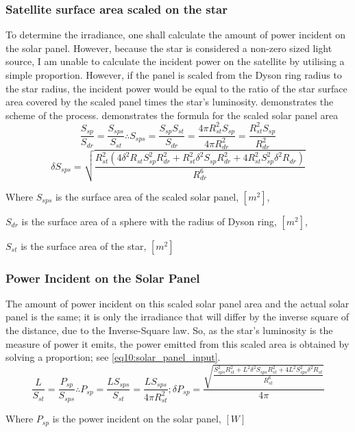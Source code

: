 \documentclass[stu, 11pt, a4paper, floatsintext, noextraspace]{apa7}
\begin{document}
	\subsubsection{Satellite surface area scaled on the star}
	To determine the irradiance, one shall calculate the amount of power incident on the solar panel. However, because the star is considered a non-zero sized light source, I am unable to calculate the incident power on the satellite by utilising a simple proportion. However, if the panel is scaled from the Dyson ring radius to the star radius, the incident power would be equal to the ratio of the star surface area covered by the scaled panel times the star's luminosity.  demonstrates the scheme of the process.  demonstrates the formula for the scaled solar panel area
	\begin{equation}
		\label{eq9:solar_panel_area_scaled}
		\frac{S_{sp}}{S_{dr}} = \frac{S_{sps}}{S_{st}} \therefore S_{sps} = \frac{S_{sp}S_{st}}{S_{dr}} = \frac{4\pi R^2_{st}S_{sp}}{4\pi R^2_{dr}}=\frac{R^2_{st}S_{sp}}{R^2_{dr}}
	\end{equation}
	\begin{equation*}
		\delta S_{sps}=\sqrt{\frac{R_{st}^2\left(4\delta^2R_{st}S_{sp}^2R_{dr}^2+R_{st}^2\delta^2S_{sp}R_{dr}^2+4R_{st}^2S_{sp}^2\delta^2R_{dr}\right)}{R_{dr}^6}}
	\end{equation*}
	\begin{center}
		Where $S_{sps}$ is the surface area of the scaled solar panel, $[m^2]$,
		
		$S_{dr}$ is the surface area of a sphere with the radius of Dyson ring, $[m^2]$,
		
		$S_{st}$ is the surface area of the star, $[m^2]$
	\end{center}
	\subsubsection{Power Incident on the Solar Panel}
	The amount of power incident on this scaled solar panel area and the actual solar panel is the same; it is only the irradiance that will differ by the inverse square of the distance, due to the Inverse-Square law. So, as the star's luminosity is the measure of power it emits, the power emitted from this scaled area is obtained by solving a proportion; see \cref{eq10:solar_panel_input}.
	\begin{equation}
		\label{eq10:solar_panel_input}
		\frac{L}{S_{st}} = \frac{P_{sp}}{S_{sps}} \therefore P_{sp} = \frac{LS_{sps}}{S_{st}}=\frac{LS_{sps}}{4\pi R_{st}^2}; \delta P_{sp}=\frac{\sqrt{\frac{S_{sps}^2R_{st}^2 + L^2\delta^2S_{sps}R_{st}^2+4L^2S_{sps}^2\delta^2R_{st}}{R_{st}^6}}}{4\pi}
	\end{equation}
	\begin{center}
		Where $P_{sp}$ is the power incident on the solar panel, $[W]$
	\end{center}
\end{document}
